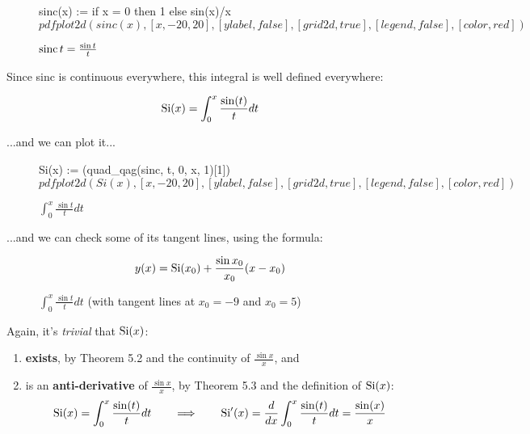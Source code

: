 \begin{figure}[H]
\begin{center}
\begin{maximacode}
sinc(x) := if x = 0 then 1 else sin(x)/x$
pdfplot2d (sinc(x),
           [x, -20, 20], [ylabel, false], [grid2d, true], [legend, false],
           [color, red])$
\end{maximacode}
\end{center}
\caption{${\rm sinc\,} t = \frac{\sin t}{t}$}
\end{figure}

Since sinc is continuous everywhere, this integral is well defined everywhere:

$${\rm Si}(x) = \int_0^x \frac{\sin(t)}{t} dt$$

...and we can plot it...

\begin{figure}[H]
\begin{center}
\begin{maximacode}
Si(x) := (quad_qag(sinc, t, 0, x, 1)[1])$
pdfplot2d (Si(x),
          [x, -20, 20], [ylabel, false], [grid2d, true], [legend, false],
          [color, red])$
\end{maximacode}
\end{center}
\caption{$\int_0^x \frac{\sin t}{t} dt$}
\end{figure}

...and we can check some of its tangent lines, using the formula:

$$ y(x) = {\rm Si}(x_0) + \frac{\sin x_0}{x_0}(x-x_0)$$

\begin{figure}[H]
\begin{center}
\end{center}
\caption{$\int_0^x \frac{\sin t}{t} dt$ (with tangent lines at $x_0=-9$ and $x_0=5$)}
\end{figure}

Again, it's {\it trivial} that ${\rm Si}(x)$:

\begin{enumerate}
\item {\bf exists}, by \cite{briggs} Theorem 5.2 and the continuity of $$, and
\item is an {\bf anti-derivative} of $$, by \cite{briggs} Theorem 5.3 and the definition of ${\rm Si}(x)$:
$${\rm Si}(x) = \int_0^x \frac{\sin(t)}{t} dt \qquad\Longrightarrow\qquad {\rm Si}'(x) = \frac{d}{dx}\int_0^x \frac{\sin(t)}{t} dt = \frac{\sin(x)}{x}$$
\end{enumerate}

